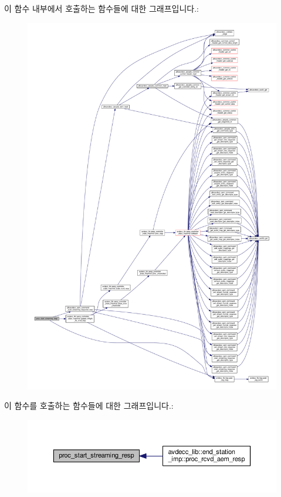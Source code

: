 이 함수 내부에서 호출하는 함수들에 대한 그래프입니다.\+:
\nopagebreak
\begin{figure}[H]
\begin{center}
\leavevmode
\includegraphics[width=350pt]{classavdecc__lib_1_1stream__output__descriptor__imp_a00065113c82302cc2e166c7a0c5f53c5_cgraph}
\end{center}
\end{figure}




이 함수를 호출하는 함수들에 대한 그래프입니다.\+:
\nopagebreak
\begin{figure}[H]
\begin{center}
\leavevmode
\includegraphics[width=350pt]{classavdecc__lib_1_1stream__output__descriptor__imp_a00065113c82302cc2e166c7a0c5f53c5_icgraph}
\end{center}
\end{figure}


